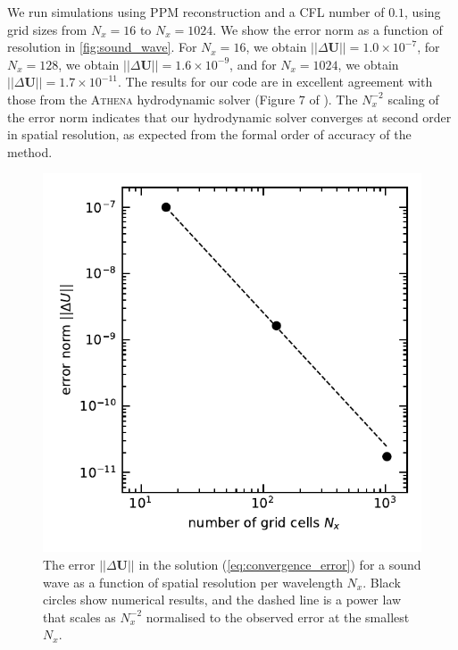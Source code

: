 \documentclass[fleqn,usenatbib]{mnras}
\newcommand{\vc}[1]{{\mathbf{#1}}}
\begin{document}
We run simulations using PPM reconstruction and a CFL number of $0.1$, using grid sizes from $N_x = 16$ to $N_x = 1024$. We show the error norm as a function of resolution in \autoref{fig:sound_wave}. For $N_x = 16$, we obtain $||\Delta \vc{U}|| = 1.0 \times 10^{-7}$, for $N_x = 128$, we obtain $||\Delta \vc{U}|| = 1.6 \times 10^{-9}$, and for $N_x = 1024$, we obtain $||\Delta \vc{U}|| = 1.7 \times 10^{-11}$. The results for our code are in excellent agreement with those from the \textsc{Athena} hydrodynamic solver (Figure 7 of \citealt{Stone_2008}). The $N_x^{-2}$ scaling of the error norm indicates that our hydrodynamic solver converges at second order in spatial resolution, as expected from the formal order of accuracy of the method.
\begin{figure}
    \includegraphics[width=\columnwidth]{wave_convergence.pdf}
    \caption{The error $||\Delta \vc{U}||$ in the solution (\autoref{eq:convergence_error}) for a sound wave as a function of spatial resolution per wavelength $N_x$. Black circles show numerical results, and the dashed line is a power law that scales as $N_x^{-2}$ normalised to the observed error at the smallest $N_x$.}
    \label{fig:sound_wave}
\end{figure}
\end{document}
